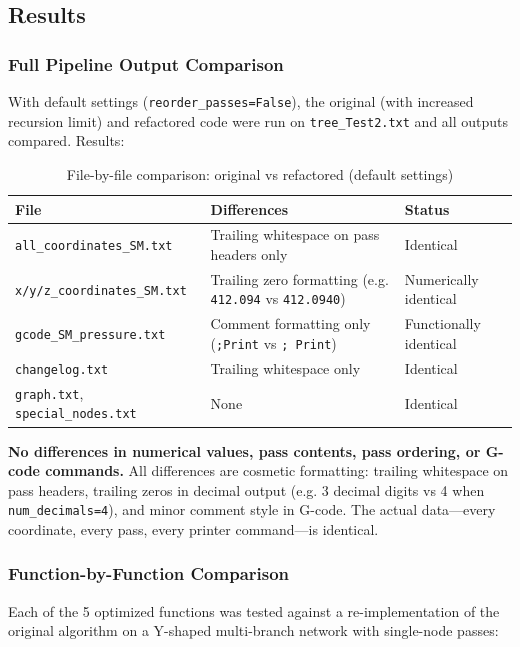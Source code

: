\documentclass[11pt,a4paper]{article}
\begin{document}
\subsection{Results}

\subsubsection{Full Pipeline Output Comparison}

With default settings (\texttt{reorder\_passes=False}), the original (with increased recursion limit) and refactored code were run on \texttt{tree\_Test2.txt} and all outputs compared. Results:

\begin{table}[H]
\centering
\caption{File-by-file comparison: original vs refactored (default settings)}
\begin{tabularx}{\textwidth}{lXl}
\toprule
\textbf{File} & \textbf{Differences} & \textbf{Status} \\
\midrule
\texttt{all\_coordinates\_SM.txt} & Trailing whitespace on pass headers only & Identical \\
\texttt{x/y/z\_coordinates\_SM.txt} & Trailing zero formatting (e.g. \texttt{412.094} vs \texttt{412.0940}) & Numerically identical \\
\texttt{gcode\_SM\_pressure.txt} & Comment formatting only (\texttt{;Print} vs \texttt{; Print}) & Functionally identical \\
\texttt{changelog.txt} & Trailing whitespace only & Identical \\
\texttt{graph.txt}, \texttt{special\_nodes.txt} & None & Identical \\
\bottomrule
\end{tabularx}
\end{table}

\textbf{No differences in numerical values, pass contents, pass ordering, or G-code commands.} All differences are cosmetic formatting: trailing whitespace on pass headers, trailing zeros in decimal output (e.g. 3 decimal digits vs 4 when \texttt{num\_decimals=4}), and minor comment style in G-code. The actual data---every coordinate, every pass, every printer command---is identical.

\subsubsection{Function-by-Function Comparison}

Each of the 5 optimized functions was tested against a re-implementation of the original algorithm on a Y-shaped multi-branch network with single-node passes:
\end{document}

